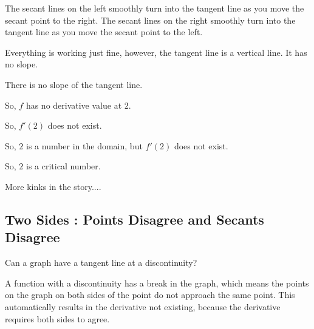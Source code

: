 \documentclass{ximera}
\begin{document}
The secant lines on the left smoothly turn into the tangent line as you move the secant point to the right. The secant lines on the right smoothly turn into the tangent line as you move the secant point to the left. 



Everything is working just fine, however, the tangent line is a vertical line.  It has no slope.


There is no slope of the tangent line. 

So, $f$ has no derivative value at $2$.  

So, $f'(2)$ does not exist. 

So, $2$ is a number in the domain, but $f'(2)$ does not exist. 

So, $2$ is a critical number.
























More kinks in the story....


\subsection*{Two Sides : Points Disagree and Secants Disagree}



Can a graph have a tangent line at a discontinuity?

A function with a discontinuity has a break in the graph, which means the points on the graph on both sides of the point do not approach the same point.  This automatically results in the derivative not existing, because the derivative requires both sides to agree.
\end{document}
